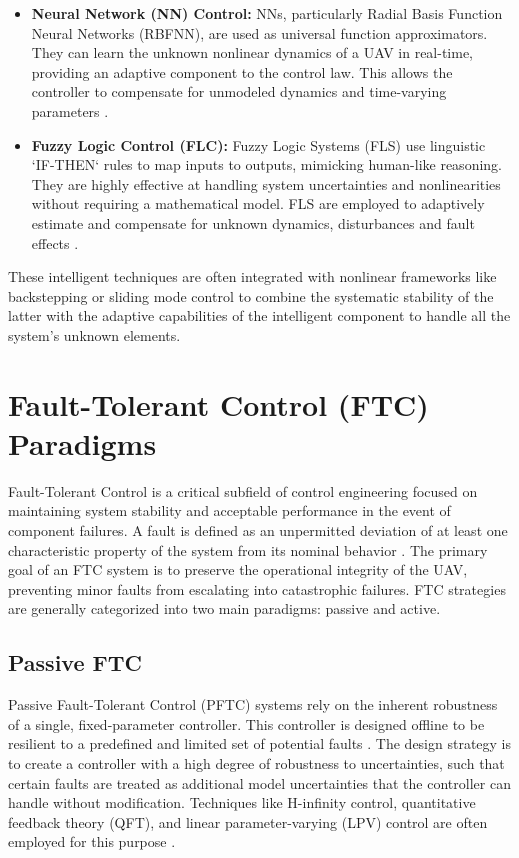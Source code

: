 \begin{itemize}
    \item \textbf{Neural Network (NN) Control:} NNs, particularly Radial Basis Function Neural Networks (RBFNN), are used as universal function approximators. They can learn the unknown nonlinear dynamics of a UAV in real-time, providing an adaptive component to the control law. This allows the controller to compensate for unmodeled dynamics and time-varying parameters  \cite{my1article,guettal2020nnbsc,guettal2022fobsc}.

    \item \textbf{Fuzzy Logic Control (FLC):} Fuzzy Logic Systems (FLS) use linguistic `IF-THEN` rules to map inputs to outputs, mimicking human-like reasoning. They are highly effective at handling system uncertainties and nonlinearities without requiring a mathematical model. FLS are employed to adaptively estimate and compensate for unknown dynamics, disturbances and fault effects  \cite{my2article,glida2019bat,guettal2020fnnbsc,PID_LQR_Ref}.
\end{itemize}
These intelligent techniques are often integrated with nonlinear frameworks like backstepping or sliding mode control to combine the systematic stability of the latter with the adaptive capabilities of the intelligent component to handle all the system's unknown elements.

\section{Fault-Tolerant Control (FTC) Paradigms}
\label{sec:ftc_paradigms}
Fault-Tolerant Control  is a critical subfield of control engineering focused on maintaining system stability and acceptable performance in the event of component failures. A fault is defined as an unpermitted deviation of at least one characteristic property of the system from its nominal behavior  \cite{ftc1,ftc2,ftc3,ftc4,glida2024tiv}. The primary goal of an FTC system is to preserve the operational integrity of the UAV, preventing minor faults from escalating into catastrophic failures. FTC strategies are generally categorized into two main paradigms: passive and active.

\subsection{Passive FTC}
Passive Fault-Tolerant Control (PFTC) systems rely on the inherent robustness of a single, fixed-parameter controller. This controller is designed offline to be resilient to a predefined and limited set of potential faults  \cite{passive1}. The design strategy is to create a controller with a high degree of robustness to uncertainties, such that certain faults are treated as additional model uncertainties that the controller can handle without modification. Techniques like H-infinity control, quantitative feedback theory (QFT), and linear parameter-varying (LPV) control are often employed for this purpose \cite{passive2,passive3,passive4}.

